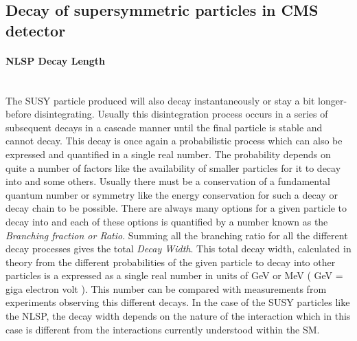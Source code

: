{\subsection{Decay of supersymmetric particles in CMS detector}
\paragraph{NLSP Decay Length}\mbox{}\\
The SUSY particle produced will also decay instantaneously or stay a bit longer-before disintegrating. Usually this disintegration process occurs in a series of subsequent decays in a cascade manner until the final particle is stable and cannot decay. This decay is once again a probabilistic process which can also be expressed and quantified in a single real number. The probability depends on quite a number of factors like the availability of smaller particles for it to decay into and some others. Usually there must be a conservation of a fundamental quantum number or symmetry like the energy conservation for such a decay or decay chain to be possible. There are always many options for a given particle to decay into and each of these options is quantified by a number known as the \textit{Branching  fraction or Ratio}. Summing all the branching ratio for all the different decay processes gives the total \textit{Decay Width}. This total decay width, calculated in theory from the different probabilities of the given particle to decay into other particles is a expressed as a single real number in units of GeV or MeV ( GeV = giga electron volt ). This number can be compared with measurements from experiments observing this different decays. In the case of the SUSY particles like the NLSP, the decay width depends on the nature of the interaction which in this case is different from the interactions currently understood within the SM.
}
